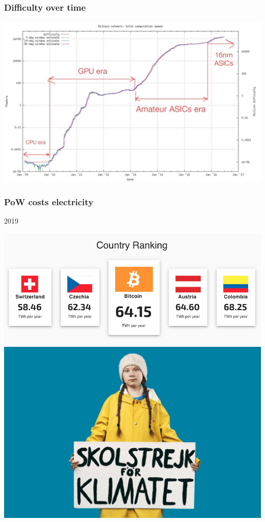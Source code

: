 \documentclass[11pt]{beamer}  %
\begin{document}
\begin{frame}\frametitle{Difficulty over time}

  \begin{center}
    \includegraphics[width=\textwidth,clip=false]{pictures/difficulty.jpg}
  \end{center}

\end{frame}

\begin{frame}\frametitle{PoW costs electricity}

  \begin{greenbox}{2019}
    \begin{center}
      \includegraphics[scale=0.17,clip=false]{pictures/bitcoin-consumption.jpg}
      \includegraphics[scale=0.14,clip=false]{pictures/greta.jpg}
    \end{center}
  \end{greenbox}
    
\end{frame}
\end{document}
